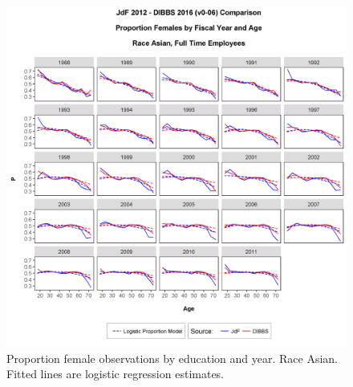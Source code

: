 \documentclass[10pt, letterpaper]{article}
\begin{document}
\begin{spacing}{1.0}
\begin{figure}[]
    \centering
    \includegraphics[width=6.5in, trim={0 0 0 1in}, clip]{GenderProportionLogisticModelFYRaceAgeBv0-06.png}
    \caption{Proportion female observations by education and year.  Race Asian.  Fitted lines are logistic regression estimates.}
    \label{figure:GenderProportionLogisticModelFYRaceAgeB}
\end{figure}

\clearpage


\end{spacing}
\end{document}
